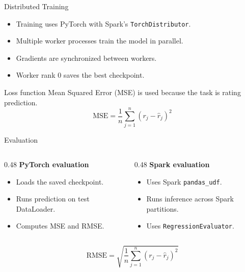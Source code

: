 \documentclass[aspectratio=169]{beamer}
\begin{document}
\begin{frame}{Distributed Training}
\begin{itemize}
  \item Training uses PyTorch with Spark's \texttt{TorchDistributor}.
  \item Multiple worker processes train the model in parallel.
  \item Gradients are synchronized between workers.
  \item Worker rank 0 saves the best checkpoint.
\end{itemize}

\vspace{0.35cm}

\begin{block}{Loss function}
Mean Squared Error (MSE) is used because the task is rating prediction.
\[
\text{MSE} = \frac{1}{n}\sum_{j=1}^{n}(r_j - \hat{r}_j)^2
\]
\end{block}
\end{frame}

\begin{frame}{Evaluation}
\begin{columns}
  \begin{column}{0.48\textwidth}
    \textbf{PyTorch evaluation}
    \begin{itemize}
      \item Loads the saved checkpoint.
      \item Runs prediction on test DataLoader.
      \item Computes MSE and RMSE.
    \end{itemize}
  \end{column}
  \begin{column}{0.48\textwidth}
    \textbf{Spark evaluation}
    \begin{itemize}
      \item Uses Spark \texttt{pandas\_udf}.
      \item Runs inference across Spark partitions.
      \item Uses \texttt{RegressionEvaluator}.
    \end{itemize}
  \end{column}
\end{columns}

\vspace{0.25cm}

\[
\text{RMSE} = \sqrt{\frac{1}{n}\sum_{j=1}^{n}(r_j - \hat{r}_j)^2}
\]
\end{frame}
\end{document}
